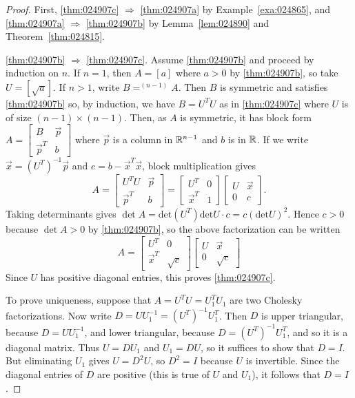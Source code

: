 \documentclass{ximera}
\begin{document}
\begin{proof}
First, \ref{thm:024907c} $\Rightarrow$ \ref{thm:024907a} by Example~\ref{exa:024865}, and \ref{thm:024907a} $\Rightarrow$ \ref{thm:024907b} by Lemma~\ref{lem:024890} and Theorem~\ref{thm:024815}.

\ref{thm:024907b} $\Rightarrow$ \ref{thm:024907c}. Assume \ref{thm:024907b} and proceed by induction on $n$. If $n = 1$, then $A = \left[ a \right]$ where $a > 0$ by \ref{thm:024907b}, so take $U = \left[ \sqrt{a} \right]$. If $n > 1$, write $B =^{(n-1)}A$. Then $B$ is symmetric and satisfies \ref{thm:024907b} so, by induction, we have $B = U^{T}U$ as in \ref{thm:024907c} where $U$ is of size $(n - 1) \times (n - 1)$. Then, as $A$ is symmetric, it has block form $A = \left[ \begin{array}{cc}
B & \vec{p} \\
\vec{p}^T & b
\end{array}\right]$ where $\vec{p}$ is a column in $\mathbb{R}^{n-1}$ and $b$ is in $\mathbb{R}$. If we write $\vec{x} = (U^{T})^{-1}\vec{p}$ and $c = b - \vec{x}^{T}\vec{x}$, block multiplication gives
\begin{equation*}
A = \left[ \begin{array}{cc}
U^TU & \vec{p} \\
\vec{p}^T & b
\end{array}\right] = \left[ \begin{array}{cc}
U^T & 0 \\
\vec{x}^T & 1
\end{array}\right] \left[ \begin{array}{cc}
U & \vec{x} \\
0 & c
\end{array}\right].
\end{equation*}
Taking determinants gives $\det A = \mbox{det}(U^{T}) \mbox{det} U \cdot c = c(\mbox{det}U)^{2}$. Hence $c > 0$ because $\det A > 0$ by \ref{thm:024907b}, so the above factorization can be written
\begin{equation*}
A = \left[ \begin{array}{cc}
U^T & 0 \\
\vec{x}^T & \sqrt{c}
\end{array}\right] \left[ \begin{array}{cc}
U & \vec{x} \\
0 & \sqrt{c}
\end{array}\right]
\end{equation*}
Since $U$ has positive diagonal entries, this proves \ref{thm:024907c}.

To prove uniqueness, suppose that $A = U^TU = U_{1}^TU_{1}$ are two Cholesky factorizations. Now write $D = UU_{1}^{-1} = (U^T)^{-1}U_{1}^T$. Then $D$ is upper triangular, because $D = UU_{1}^{-1}$, and lower triangular, because $D = (U^T)^{-1}U_{1}^T$, and so it is a diagonal matrix. Thus $U = DU_{1}$ and $U_{1} = DU$, so it suffices to show that $D = I$. But eliminating $U_{1}$ gives $U = D^{2}U$, so $D^{2} = I$ because $U$ is invertible. Since the diagonal entries of $D$ are positive (this is true of $U$ and $U_{1}$), it follows that $D = I$.
\end{proof}
\end{document}
